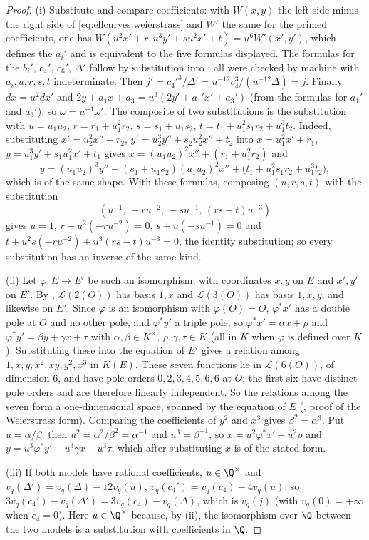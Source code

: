 \begin{proof}
(i) Substitute and compare coefficients: with $W(x,y)$ the left side minus the right side of \eqref{eq:ellcurves:weierstrass} and $W'$ the same
for the primed coefficients, one has $W(u^2x'+r,u^3y'+su^2x'+t)=u^6W'(x',y')$, which defines the $a_i'$ and is equivalent to the five formulas
displayed. The formulas for the $b_i'$, $c_4'$, $c_6'$, $\Delta'$ follow by substitution into ; all were checked
by machine with $a_i,u,r,s,t$ indeterminate. Then $j'=c_4'^3/\Delta'=u^{-12}c_4^3/(u^{-12}\Delta)=j$. Finally $dx=u^2dx'$ and
$2y+a_1x+a_3=u^3(2y'+a_1'x'+a_3')$ (from the formulas for $a_1'$ and $a_3'$), so $\omega=u^{-1}\omega'$. The composite of two substitutions is
the substitution with $u=u_1u_2$, $r=r_1+u_1^2r_2$, $s=s_1+u_1s_2$, $t=t_1+u_1^2s_1r_2+u_1^3t_2$. Indeed, substituting
$x'=u_2^2x''+r_2$, $y'=u_2^3y''+s_2u_2^2x''+t_2$ into $x=u_1^2x'+r_1$, $y=u_1^3y'+s_1u_1^2x'+t_1$ gives $x=(u_1u_2)^2x''+(r_1+u_1^2r_2)$ and
\[
y=(u_1u_2)^3y''+(s_1+u_1s_2)(u_1u_2)^2x''+\bigl(t_1+u_1^2s_1r_2+u_1^3t_2\bigr),
\]
which is of the same shape. With these formulas, composing $(u,r,s,t)$ with the substitution
\[
(u^{-1},\,-ru^{-2},\,-su^{-1},\,(rs-t)u^{-3})
\]
gives $u=1$, $r+u^2(-ru^{-2})=0$,
$s+u(-su^{-1})=0$ and $t+u^2s(-ru^{-2})+u^3(rs-t)u^{-3}=0$, the identity substitution; so every substitution has an inverse of the same kind.

(ii) Let $\varphi\colon E\to E'$ be such an isomorphism, with coordinates $x,y$ on $E$ and $x',y'$ on $E'$. By , $\mathcal L(2(O))$ has
basis $1,x$ and $\mathcal L(3(O))$ has basis $1,x,y$, and likewise on $E'$. Since $\varphi$ is an isomorphism with $\varphi(O)=O$, $\varphi^*x'$ has a
double pole at $O$ and no other pole, and $\varphi^*y'$ a triple pole; so $\varphi^*x'=\alpha x+\rho$ and $\varphi^*y'=\beta y+\gamma x+\tau$ with
$\alpha,\beta\in K^\times$, $\rho,\gamma,\tau\in K$ (all in $K$ when $\varphi$ is defined over $K$). Substituting these into the equation of $E'$ gives a relation
among $1,x,y,x^2,xy,y^2,x^3$ in $K(E)$. These seven functions lie in $\mathcal L(6(O))$, of dimension $6$, and have pole orders $0,2,3,4,5,6,6$ at $O$; the first six have
distinct pole orders and are therefore linearly independent. So the relations among the seven form a one-dimensional space, spanned by the
equation of $E$ (, proof of the Weierstrass form). Comparing the coefficients of $y^2$ and $x^3$ gives $\beta^2=\alpha^3$. Put $u=\alpha/\beta$; then $u^2=\alpha^2/\beta^2=\alpha^{-1}$ and
$u^3=\beta^{-1}$, so $x=u^2\varphi^*x'-u^2\rho$ and $y=u^3\varphi^*y'-u^3\gamma x-u^3\tau$, which after substituting $x$ is of the stated form.

(iii) If both models have rational coefficients, $u\in\Q^\times$ and $v_q(\Delta')=v_q(\Delta)-12v_q(u)$, $v_q(c_4')=v_q(c_4)-4v_q(u)$; so
$3v_q(c_4')-v_q(\Delta')=3v_q(c_4)-v_q(\Delta)$, which is $v_q(j)$ (with $v_q(0)=+\infty$ when $c_4=0$). Here $u\in\Q^\times$ because, by (ii), the
isomorphism over $\Q$ between the two models is a substitution with coefficients in $\Q$.
\end{proof}

